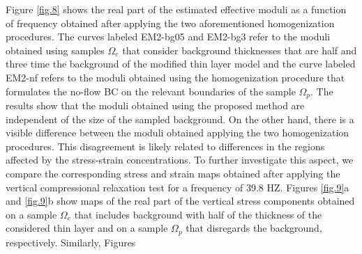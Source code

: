 \documentclass[draft]{agujournal2019}
\begin{document}
Figure \ref{fig.8} shows the real part of the estimated effective moduli as a function of frequency obtained after applying the two aforementioned homogenization procedures.
The curves labeled EM2-bg05 and EM2-bg3 refer to the moduli obtained using samples $\Omega_e$ that consider background thicknesses that are half and three time the background of the modified thin layer model and the curve labeled EM2-nf refers to the moduli obtained using the homogenization procedure that formulates the no-flow BC on the relevant boundaries of the sample $\Omega_p$. The results show that the moduli obtained using the proposed method are independent of the size of the sampled background. On the other hand, there is a visible difference between the moduli obtained applying the two homogenization procedures.%
 This disagreement is likely related to differences in the regions affected by the stress-strain concentrations. To further investigate this aspect, we compare the corresponding stress and strain maps obtained after applying the vertical compressional relaxation test for a frequency of 39.8 HZ. Figures \ref{fig.9}a and \ref{fig.9}b show maps of the real part of the vertical stress components obtained on a sample $\Omega_e$ that includes background with half of the thickness of the considered thin layer and on a sample $\Omega_p$ that disregards the background, respectively. Similarly, Figures
\end{document}
